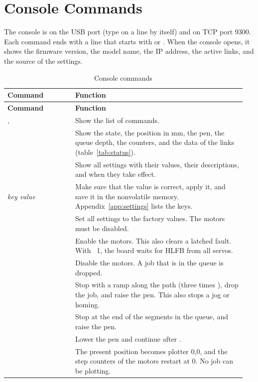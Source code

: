 \chapter{Console Commands}\label{app:console}

The console is on the USB port (type  on a line by itself) and on
TCP port 9300. Each command ends with a line that starts with  or
. When the console opens, it shows the firmware version, the
model name, the IP address, the active links, and the source of the
settings.

\begin{longtable}{@{}P{0.27\linewidth}P{0.68\linewidth}@{}}
\caption{Console commands}\label{tab:console}\\
\toprule
\textbf{Command} & \textbf{Function} \\
\midrule
\endfirsthead
\toprule
\textbf{Command} & \textbf{Function} \\
\midrule
\endhead
\bottomrule
\endfoot
{},  & Show the list of commands. \\
 & Show the state, the position in mm, the pen, the queue depth,
the counters, and the data of the links (table~\ref{tab:status}). \\
 & Show all settings with their values, their descriptions, and
when they take effect. \\
 \textit{key value} & Make sure that the value is correct, apply it,
and save it in the nonvolatile memory. Appendix~\ref{app:settings} lists the
keys. \\
 & Set all settings to the factory values. The motors must be
disabled. \\
 & Enable the motors. This also clears a latched fault. With
~1, the board waits for HLFB from all servos. \\
 & Disable the motors. A job that is in the queue is dropped. \\
 & Stop with a ramp along the path (three times ), drop the job, and raise the pen. This also stops a jog or homing. \\
 & Stop at the end of the segments in the queue, and raise the pen. \\
 & Lower the pen and continue after . \\
 & The present position becomes plotter 0,0, and the step counters
of the motors restart at 0. No job can be plotting. \\

\end{longtable}
